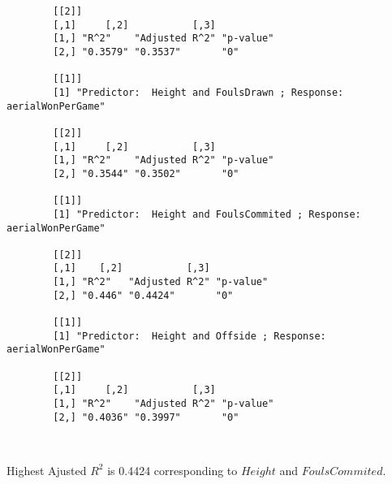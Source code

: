 \documentclass[12pt]{article}
\begin{document}
\begin{verbatim}
		[[2]]
		[,1]     [,2]           [,3]     
		[1,] "R^2"    "Adjusted R^2" "p-value"
		[2,] "0.3579" "0.3537"       "0"      
		
		[[1]]
		[1] "Predictor:  Height and FoulsDrawn ; Response:  aerialWonPerGame"
		
		[[2]]
		[,1]     [,2]           [,3]     
		[1,] "R^2"    "Adjusted R^2" "p-value"
		[2,] "0.3544" "0.3502"       "0"      
		
		[[1]]
		[1] "Predictor:  Height and FoulsCommited ; Response:  aerialWonPerGame"
		
		[[2]]
		[,1]    [,2]           [,3]     
		[1,] "R^2"   "Adjusted R^2" "p-value"
		[2,] "0.446" "0.4424"       "0"      
		
		[[1]]
		[1] "Predictor:  Height and Offside ; Response:  aerialWonPerGame"
		
		[[2]]
		[,1]     [,2]           [,3]     
		[1,] "R^2"    "Adjusted R^2" "p-value"
		[2,] "0.4036" "0.3997"       "0"      
		
		
	\end{verbatim}
	Highest Ajusted $ R^2 $ is 0.4424 corresponding to $ Height $ and $ FoulsCommited $.
	
\end{document}
